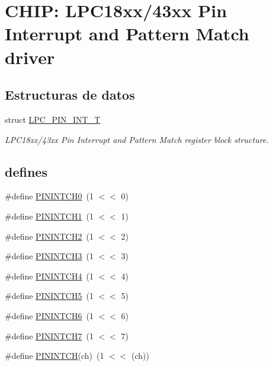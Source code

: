 \hypertarget{group___p_i_n_i_n_t__18_x_x__43_x_x}{}\section{C\+H\+IP\+: L\+P\+C18xx/43xx Pin Interrupt and Pattern Match driver}
\label{group___p_i_n_i_n_t__18_x_x__43_x_x}
\subsection*{Estructuras de datos}
\begin{DoxyCompactItemize}
\item 
struct \hyperlink{struct_l_p_c___p_i_n___i_n_t___t}{L\+P\+C\+\_\+\+P\+I\+N\+\_\+\+I\+N\+T\+\_\+T}
\begin{DoxyCompactList}\small\item\em L\+P\+C18xx/43xx Pin Interrupt and Pattern Match register block structure. \end{DoxyCompactList}\end{DoxyCompactItemize}
\subsection*{\textquotesingle{}defines\textquotesingle{}}
\begin{DoxyCompactItemize}
\item 
\#define \hyperlink{group___p_i_n_i_n_t__18_x_x__43_x_x_gaba419aacec8ac614ec6d121e05bf79cd}{P\+I\+N\+I\+N\+T\+C\+H0}~(1 $<$$<$ 0)
\item 
\#define \hyperlink{group___p_i_n_i_n_t__18_x_x__43_x_x_gae8f33cd2dabaa92a5e3dd4d8dbe5f6ed}{P\+I\+N\+I\+N\+T\+C\+H1}~(1 $<$$<$ 1)
\item 
\#define \hyperlink{group___p_i_n_i_n_t__18_x_x__43_x_x_gaabd4245998a4e0c9ee040916b8b5c62f}{P\+I\+N\+I\+N\+T\+C\+H2}~(1 $<$$<$ 2)
\item 
\#define \hyperlink{group___p_i_n_i_n_t__18_x_x__43_x_x_ga83ffe2314036836a570861fdfb983e75}{P\+I\+N\+I\+N\+T\+C\+H3}~(1 $<$$<$ 3)
\item 
\#define \hyperlink{group___p_i_n_i_n_t__18_x_x__43_x_x_gaeff8dc2ad86edbabd3b871c3c0676e9b}{P\+I\+N\+I\+N\+T\+C\+H4}~(1 $<$$<$ 4)
\item 
\#define \hyperlink{group___p_i_n_i_n_t__18_x_x__43_x_x_ga39cebaf09c7a9f77d607dbf344c53f82}{P\+I\+N\+I\+N\+T\+C\+H5}~(1 $<$$<$ 5)
\item 
\#define \hyperlink{group___p_i_n_i_n_t__18_x_x__43_x_x_gac067933ca09f529b57e1f6c9f55109ca}{P\+I\+N\+I\+N\+T\+C\+H6}~(1 $<$$<$ 6)
\item 
\#define \hyperlink{group___p_i_n_i_n_t__18_x_x__43_x_x_ga0f3c2aeafda4746d1c275164fd5dc832}{P\+I\+N\+I\+N\+T\+C\+H7}~(1 $<$$<$ 7)
\item 
\#define \hyperlink{group___p_i_n_i_n_t__18_x_x__43_x_x_ga8d78afc0f4b847de15629e9cd297fd72}{P\+I\+N\+I\+N\+T\+CH}(ch)~(1 $<$$<$ (ch))
\end{DoxyCompactItemize}
